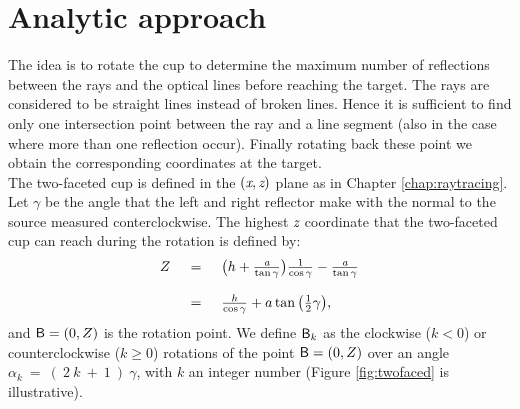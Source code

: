 \section{Analytic approach}
The idea is to rotate the cup to determine the maximum number of reflections between the rays and the optical lines before reaching the target. The rays are considered to be straight lines instead of broken lines. Hence it is sufficient to find only one intersection point between the ray and a line segment (also in the case where more than one reflection occur). Finally rotating back these point we obtain the corresponding coordinates at the target.\\ \indent
The two-faceted cup is defined in the $(\textit{x}, \textit{z})$ plane as in Chapter \ref{chap:raytracing}. 
Let $\gamma$ be the angle that the left and right reflector make with the normal to the source measured conterclockwise. 
The highest $\textit{z}$ coordinate that the two-faceted cup can reach during the rotation is defined by:
\begin{equation}\label{rotation}\begin{tabular}{llll}
$Z$ & $=$ & $ \big(h+\frac{\variabile{a}}{\tan\gamma}\big)\frac{1}{\cos\gamma}-\frac{\variabile{a}}{\tan\gamma}$ \\ $ \quad$ & $ \quad $ & $ \quad $ \\$ \quad$ &  $=$ & $\frac{h}{\cos\gamma}+a\tan\big(\frac{1}{2}\gamma\big),$\end{tabular}
\end{equation} and $\textsf{B}=(0,Z)$ is the rotation point. We define $\textsf{B}_k$ as the clockwise ($k<0$) or counterclockwise ($k\geq 0$) rotations of the point $\textsf{B}=(0,Z)$ over an angle $\alpha_k~=~(~2~k~+~1~)~\gamma$, with $k$ an integer number (Figure \ref{fig:twofaced} is illustrative).
